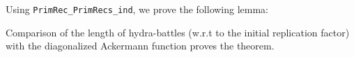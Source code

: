 \documentclass[10pt, fleqn]{beamer}
\begin{document}

  
        

        


\begin{frame}
  \frametitle{}
  \begin{scriptsize}
  \end{scriptsize}
\end{frame}


\begin{frame}
  \begin{block}{}
    Using  \texttt{PrimRec\_PrimRecs\_ind}, we prove the following lemma:
    
  
  
Comparison of the length of hydra-battles (w.r.t to the initial replication factor) with the diagonalized Ackermann function proves the theorem.
  \end{block}
\end{frame}


\end{document}
